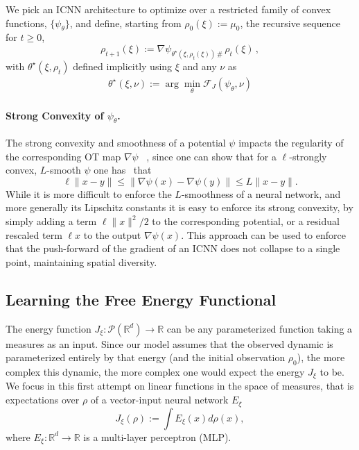 We pick an ICNN architecture to optimize over a restricted family of convex functions, $\{\psi_{\theta}\}$, and define, starting from $\rho_0(\xi):=\mu_0$, the recursive sequence for $t\geq 0$,
\begin{equation} \label{eq:next_pop}
\rho_{t+1}(\xi) := \nabla \psi_{\theta^\star\!(\xi, \rho_t(\xi))\, \#}\, \rho_{t}(\xi)\,,
\end{equation}
with $\theta^\star(\xi, \rho_t)$ defined implicitly using $\xi$ and any $\nu$ as 
\begin{align} \label{eq:thetastar}
    \theta^\star(\xi, \nu):=\arg \min_{\theta} \mathcal{F}_J(\psi_{\theta},\nu)
\end{align}

\vspace{-20pt} \paragraph{Strong Convexity of $\psi_\theta$.} The strong convexity and smoothness of a potential $\psi$ impacts the regularity of the corresponding OT map $\nabla\psi$ ~\citep{caffarelli2000monotonicity,figalli2010optimal}, since one can show that for a $\ell$-strongly convex, $L$-smooth $\psi$ one has~\citep{paty2020regularity} that
$$
\ell \|x - y\| \leq \|\nabla\psi(x) -\nabla\psi(y)\|  \leq L\|x - y\|.
$$
While it is more difficult to enforce the $L$-smoothness of a neural network, and more generally its Lipschitz constants \citep{scaman2018lipschitz} it is easy to enforce its strong convexity, by simply adding a term $\ell \|x\|^2/2$ to the corresponding potential, or a residual rescaled term $\ell x$ to the output $\nabla\psi(x)$. This approach can be used to enforce that the push-forward of the gradient of an ICNN does not collapse to a single point, maintaining spatial diversity.

\subsection{Learning the Free Energy Functional}  \label{sec:learn_energy}
The energy function $J_\xi : \mathcal{P}(\mathbb{R}^d) \rightarrow \mathbb{R}$ can be any parameterized function taking a measures as an input. 
Since our model assumes that the observed dynamic is parameterized entirely by that energy (and the initial observation $\rho_0$), the more complex this dynamic, the more complex one would expect the energy $J_\xi$ to be. We focus in this first attempt on linear functions in the space of measures, that is expectations over $\rho$ of a vector-input neural network $E_\xi$
\begin{equation} \label{eq:energy}
    J_\xi(\rho) := \int E_\xi(x) d\rho(x),
\end{equation}
where $E_\xi:\mathbb{R}^d \rightarrow \mathbb{R}$ is a multi-layer perceptron (MLP).

